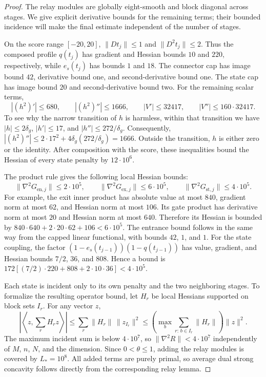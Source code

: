 \documentclass[11pt,letterpaper]{article}
\theoremstyle{definition}
\theoremstyle{remark}
\begin{document}
\begin{proof}
The relay modules are globally eight-smooth and block diagonal across
stages.  We give explicit derivative bounds for the remaining terms;
their bounded incidence will make the final estimate independent of
the number of stages.

On the score range $[-20,20]$,
$\|Dt_j\|\le1$ and $\|D^2t_j\|\le2$.
Thus the composed profile $q(t_j)$ has gradient and Hessian bounds
$10$ and $220$, respectively, while $e_s(t_j)$ has bounds $1$ and $18$.
The connector cap has image bound $42$, derivative bound one, and
second-derivative bound one.  The state cap has image bound $20$ and
second-derivative bound two.
For the remaining scalar terms,
\[
 |(h^2)'|\le680,\qquad |(h^2)''|\le1666,
 \qquad |V'|\le32417,
 \qquad |V''|\le160\cdot32417.
\]
To see why the narrow transition of $h$ is harmless, within that
transition we have
$|h|\le2\delta_g$, $|h'|\le17$, and
$|h''|\le272/\delta_g$.
Consequently,
$|(h^2)''|\le2\cdot17^2+4\delta_g(272/\delta_g)=1666$.
Outside the transition, $h$ is either zero or the identity.
After composition with the score, these inequalities bound the Hessian
of every state penalty by $12\cdot10^6$.

The product rule gives the following local Hessian bounds:
\[
 \|\nabla^2G_{\mathrm{en},j}\|\le2\cdot10^5,
 \qquad
 \|\nabla^2G_{\mathrm{ex},j}\|\le6\cdot10^5,
 \qquad
 \|\nabla^2G_{\mathrm{st},j}\|\le4\cdot10^5.
\]
For example, the exit inner product has absolute value at most $840$,
gradient norm at most $62$, and Hessian norm at most $106$.
Its gate product has derivative norm at most $20$ and Hessian norm at
most $640$.  Therefore its Hessian is bounded by
$840\cdot640+2\cdot20\cdot62+106<6\cdot10^5$.
The entrance bound follows in the same way from the capped linear
functional, with bounds $42$, $1$, and $1$.
For the state coupling, the factor
$(1-e_s(t_{j-1}))(1-q(t_{j-1}))$ has value, gradient, and Hessian bounds
$7/2$, $36$, and $808$.  Hence a bound is
$172[(7/2)\cdot220+808+2\cdot10\cdot36]<4\cdot10^5$.

Each state is incident only to its own penalty and the two neighboring
stages.  To formalize the resulting operator bound, let $H_r$ be local
Hessians supported on block sets $I_r$.  For any vector $z$,
\[
 \left|\left\langle z,\sum_r H_rz\right\rangle\right|
 \le\sum_r\|H_r\|\,\|z_{I_r}\|^2
 \le\left(\max_b\sum_{r:\,b\in I_r}\|H_r\|\right)\|z\|^2.
\]
The maximum incident sum is below $4\cdot10^7$, so
$\|\nabla^2R\|<4\cdot10^7$ independently of $M$, $n$, $N$, and
the dimension.  Since $0<\theta\le1$, adding the relay modules is
covered by $L_*=10^8$.
All added terms are purely primal, so average dual strong concavity
follows directly from the corresponding relay lemma.


\end{proof}
\end{document}
